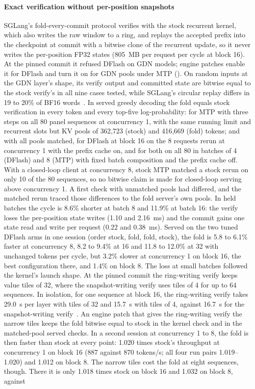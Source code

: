 \paragraph{Exact verification without per-position snapshots} SGLang's fold-every-commit protocol verifies with the stock recurrent kernel, which also writes the raw window to a ring, and replays the accepted prefix into the checkpoint at commit with a bitwise clone of the recurrent update, so it never writes the per-position FP32 states (805~MB per request per cycle at block 16). At the pinned commit it refused DFlash on GDN models; engine patches enable it for DFlash and turn it on for GDN pools under MTP (). On random inputs at the GDN layer's shape, its verify output and committed state are bitwise equal to the stock verify's in all nine cases tested, while SGLang's circular replay differs in 19 to 20\% of BF16 words~. In served greedy decoding the fold equals stock verification in every token and every top-five log-probability: for MTP with three steps on all 80 panel sequences at concurrency 1, with the same running limit and recurrent slots but KV pools of 362,723 (stock) and 416,669 (fold) tokens; and with all pools matched, for DFlash at block 16 on the 8 requests rerun at concurrency 1 with the prefix cache on, and for both on all 80 in batches of 4 (DFlash) and 8 (MTP) with fixed batch composition and the prefix cache off. With a closed-loop client at concurrency 8, stock MTP matched a stock rerun on only 10 of the 80 sequences, so no bitwise claim is made for closed-loop serving above concurrency 1. A first check with unmatched pools had differed, and the matched rerun traced those differences to the fold server's own pools. In held batches the cycle is 8.6\% shorter at batch 8 and 11.9\% at batch 16: the verify loses the per-position state writes (1.10 and 2.16~ms) and the commit gains one state read and write per request (0.22 and 0.38~ms). Served on the two tuned DFlash arms in one session (order stock, fold, fold, stock), the fold is 5.8 to 6.1\% faster at concurrency 8, 8.2 to 9.4\% at 16 and 11.8 to 12.0\% at 32 with unchanged tokens per cycle, but 3.2\% slower at concurrency 1 on block 16, the best configuration there, and 1.4\% on block 8. The loss at small batches followed the kernel's launch shape. At the pinned commit the ring-writing verify keeps value tiles of 32, where the snapshot-writing verify uses tiles of 4 for up to 64 sequences. In isolation, for one sequence at block 16, the ring-writing verify takes 29.0~\textmu s per layer with tiles of 32 and 15.7~\textmu s with tiles of 4, against 16.7~\textmu s for the snapshot-writing verify~. An engine patch that gives the ring-writing verify the narrow tiles keeps the fold bitwise equal to stock in the kernel check and in the matched-pool served checks. In a second session at concurrency 1 to 8, the fold is then faster than stock at every point: 1.020 times stock's throughput at concurrency 1 on block 16 (887 against 870 tokens/s; all four run pairs 1.019--1.020) and 1.012 on block 8. The narrow tiles cost the fold at eight sequences, though. There it is only 1.018 times stock on block 16 and 1.032 on block 8, against 